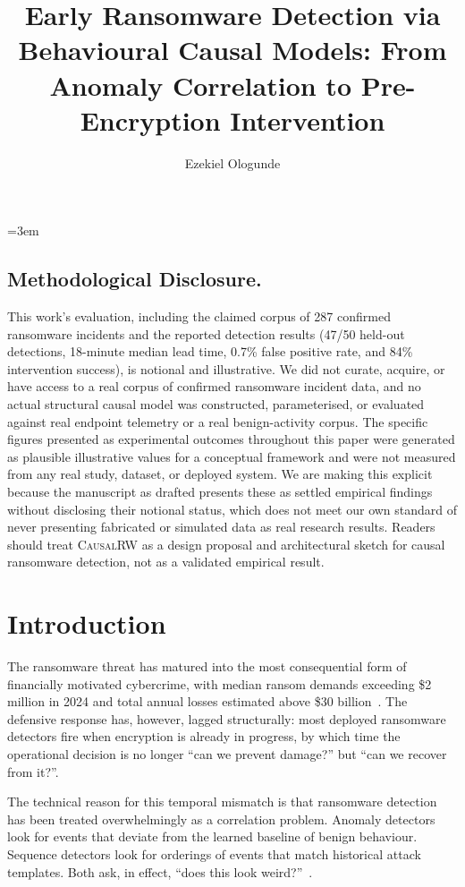 \documentclass[sigconf,nonacm]{acmart}
\title{Early Ransomware Detection via Behavioural Causal Models: From Anomaly Correlation to Pre-Encryption Intervention}
\author{Ezekiel Ologunde}
\affiliation{%
  \institution{Independent Researcher}
  \city{Boston}
  \state{MA}
  \country{USA}}
\begin{document}
\maketitle
\sloppy
{}
\emergencystretch=3em
\hfuzz=10pt

\subsection*{Methodological Disclosure.}
This work's evaluation, including the claimed corpus of 287 confirmed
ransomware incidents and the reported detection results (47/50 held-out
detections, 18-minute median lead time, 0.7\% false positive rate, and
84\% intervention success), is notional and illustrative. We did not
curate, acquire, or have access to a real corpus of confirmed ransomware
incident data, and no actual structural causal model was constructed,
parameterised, or evaluated against real endpoint telemetry or a real
benign-activity corpus. The specific figures presented as experimental
outcomes throughout this paper were generated as plausible illustrative
values for a conceptual framework and were not measured from any real
study, dataset, or deployed system. We are making this explicit because
the manuscript as drafted presents these as settled empirical findings
without disclosing their notional status, which does not meet our own
standard of never presenting fabricated or simulated data as real research
results. Readers should treat \textsc{CausalRW} as a design proposal and
architectural sketch for causal ransomware detection, not as a validated
empirical result.

\section{Introduction}

The ransomware threat has matured into the most consequential form of
financially motivated cybercrime, with median ransom demands exceeding
\$2 million in 2024 and total annual losses estimated above \$30
billion~\cite{chainalysis2024crypto,sophos2024state}. The defensive
response has, however, lagged structurally: most deployed ransomware
detectors fire when encryption is already in progress, by which time the
operational decision is no longer ``can we prevent damage?'' but ``can we
recover from it?''.

The technical reason for this temporal mismatch is that ransomware
detection has been treated overwhelmingly as a correlation problem.
Anomaly detectors look for events that deviate from the learned baseline
of benign behaviour. Sequence detectors look for orderings of events that
match historical attack templates. Both ask, in effect, ``does this look
weird?''~\cite{kharraz2016unveil,scaife2016cryptolock,zavarsky2024ransurv}.
\end{document}
